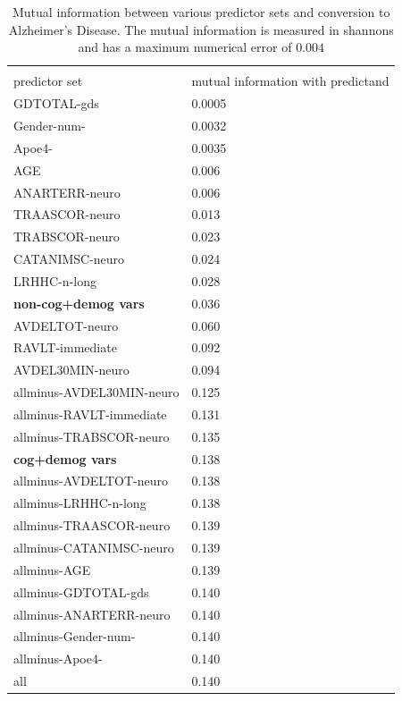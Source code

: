\documentclass[utf8]{FrontiersinHarvard} %
\renewcommand*{\|}[1][]{\nonscript\:#1\vert\nonscript\:\mathopen{}}
\newcommand*{\ad}{Alzheimer's Disease}
\begin{document}
\begin{table}[!t]
  \centering
  \begin{tabular}{ll}
    \hline\\[-1.5\jot]
    {\small predictor set} &{\small mutual information with predictand}
    \\[\jot]
GDTOTAL-gds               &0.0005  \\
Gender-num-               &0.0032  \\
Apoe4-                    &0.0035  \\
AGE                       &0.006  \\
ANARTERR-neuro            &0.006  \\
TRAASCOR-neuro            &0.013  \\
TRABSCOR-neuro            &0.023  \\
CATANIMSC-neuro           &0.024  \\
LRHHC-n-long              &0.028  \\
\textbf{non-cog+demog vars}         &0.036  \\
AVDELTOT-neuro            &0.060  \\
RAVLT-immediate           &0.092  \\
AVDEL30MIN-neuro          &0.094  \\
allminus-AVDEL30MIN-neuro &0.125  \\
allminus-RAVLT-immediate  &0.131  \\
allminus-TRABSCOR-neuro   &0.135  \\
\textbf{cog+demog vars}            &0.138  \\
allminus-AVDELTOT-neuro   &0.138  \\
allminus-LRHHC-n-long     &0.138  \\
allminus-TRAASCOR-neuro   &0.139  \\
allminus-CATANIMSC-neuro  &0.139  \\
allminus-AGE              &0.139  \\
allminus-GDTOTAL-gds      &0.140  \\
allminus-ANARTERR-neuro   &0.140  \\
allminus-Gender-num-      &0.140  \\
allminus-Apoe4-           &0.140  \\
all                       &0.140  \\[\jot]
    \hline
  \end{tabular}
  \caption{Mutual information between various predictor sets and conversion to \ad. The mutual information is measured in shannons and has a maximum numerical error of $0.004$}\label{tab:mutual_info}
\end{table}
\end{document}
